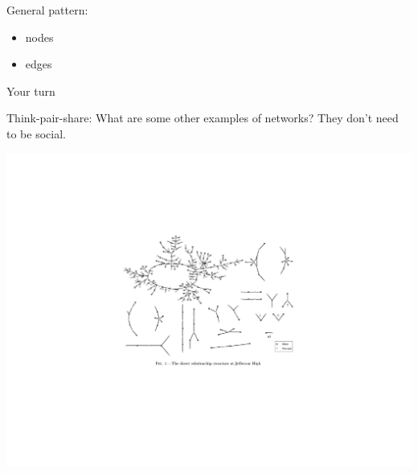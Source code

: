 \documentclass[aspectratio=169]{beamer}
\begin{document}
\begin{frame}

General pattern:
\begin{itemize}
\item nodes
\item edges
\end{itemize}

\end{frame}
\begin{frame}

\begin{center}
\Large{Your turn}
\end{center}

Think-pair-share: What are some other examples of networks? They don't need to be social.

\end{frame}
\begin{frame}

\begin{center}
\includegraphics[width=0.95\textheight]{figures/bearman_chains_2004_fig2}
\end{center}

\vfill
{}

\end{frame}
\end{document}
